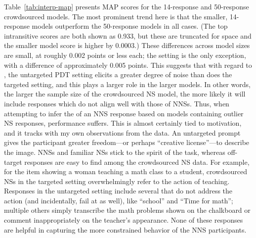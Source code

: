 Table~\ref{tab:interp-map} presents  MAP scores for the 14-response and 50-response crowdsourced models. The most prominent trend here is that the smaller, 14-response models outperform the 50-response models in all cases. (The top intransitive scores are both shown as 0.933, but these are truncated for space and the smaller model score is higher by 0.0003.) These differences across model sizes are small, at roughly 0.002 points or less each; the  setting is the only exception, with a difference of approximately 0.005 points. This suggests that with regard to , the untargeted PDT setting elicits a greater degree of noise than does the targeted setting, and this plays a larger role in the larger models. In other words, the larger the sample size of the crowdsourced NS model, the more likely it will include responses which do not align well with those of NNSs. Thus, when attempting to infer the  of an NNS response based on models containing outlier NS responses, performance suffers. This is almost certainly tied to motivation, and it tracks with my own observations from the data. An untargeted prompt gives the participant greater freedom---or perhaps ``creative license''---to describe the image. NNSs and familiar NSs  stick to the spirit of the task, whereas off-target responses are easy to find among the crowdsourced NS data. For example, for the item showing a woman teaching a math class to a student, crowdsourced NSs in the targeted setting overwhelmingly refer to the action of teaching. Responses in the untargeted setting include several that do not address the action (and incidentally, fail at  as well), like ``school'' and ``Time for math''; multiple others simply transcribe the math problems shown on the chalkboard or comment inappropriately on the teacher's appearance. None of these responses are helpful in capturing the more constrained behavior of the NNS participants.


